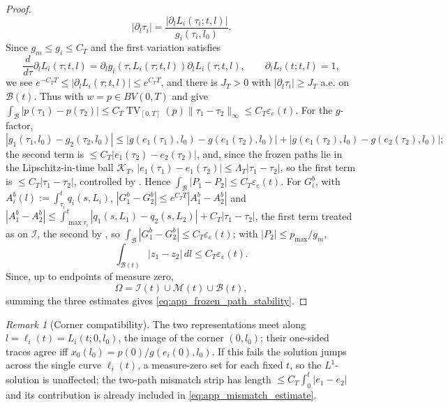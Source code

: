 \documentclass[a4paper,fleqn,longmktitle]{cas-sc}
\theoremstyle{plain}
\theoremstyle{definition}
\theoremstyle{remark}
\newtheorem{remark}[theorem]{Remark}
\numberwithin{equation}{section}
\begin{document}
\begin{proof}
\[
    |\partial_l\tau_i|
    =
    \frac{|\partial_lL_i(\tau_i;t,l)|}{g_i(\tau_i,l_0)}.
\]
Since \(g_m\le g_i\le C_T\) and the first variation satisfies
\[
    \frac{d}{d\tau}\partial_lL_i(\tau;t,l)
    =
    \partial_lg_i(\tau,L_i(\tau;t,l))\partial_lL_i(\tau;t,l),
    \qquad
    \partial_lL_i(t;t,l)=1,
\]
we see $e^{-C_TT}
    \le
    |\partial_lL_i(\tau;t,l)|
    \le
    e^{C_TT}$, and there is \(J_T>0\) with \(|\partial_l\tau_i|\ge J_T\) a.e. on \(\mathcal B(t)\).
Thus  with \(w=p\in BV(0,T)\) and
 give
\(\int_{\mathcal B}|p(\tau_1)-p(\tau_2)|\le C_T\operatorname{TV}_{[0,T]}(p)
\|\tau_1-\tau_2\|_\infty\le C_T\varepsilon_e(t)\). For the \(g\)-factor,
\[
    |g_1(\tau_1,l_0)-g_2(\tau_2,l_0)|
    \le
    |g(e_1(\tau_1),l_0)-g(e_1(\tau_2),l_0)|
    +
    |g(e_1(\tau_2),l_0)-g(e_2(\tau_2),l_0)|;
\]
the second term is \(\le C_T|e_1(\tau_2)-e_2(\tau_2)|\), and, since the frozen
paths lie in the Lipschitz-in-time ball \(\mathcal K_T\),
\(|e_1(\tau_1)-e_1(\tau_2)|\le\Lambda_T|\tau_1-\tau_2|\), so the first term is
\(\le C_T|\tau_1-\tau_2|\), controlled by .
Hence \(\int_{\mathcal B}|P_1-P_2|\le C_T\varepsilon_e(t)\). For \(G_i^b\), with
\(A_i^b(l):=\int_{\tau_i}^t q_i(s,L_i)\), \(|G_1^b-G_2^b|\le e^{C_TT}|A_1^b-A_2^b|\)
and
\(|A_1^b-A_2^b|\le\int_{\max\tau_i}^t|q_1(s,L_1)-q_2(s,L_2)|+C_T|\tau_1-\tau_2|\),
the first term treated as on \(\mathcal I\), the second by
, so
\(\int_{\mathcal B}|G_1^b-G_2^b|\le C_T\varepsilon_e(t)\); with
\(|P_2|\le p_{\max}/g_m\),
\begin{equation}
    \label{eq:app_boundary_region_estimate}
    \int_{\mathcal B(t)}|z_1-z_2|\,dl\le C_T\varepsilon_e(t).
\end{equation}
Since, up to endpoints of measure zero,
\[
    \Omega=\mathcal I(t)\cup\mathcal M(t)\cup\mathcal B(t),
\]
summing the three estimates gives \eqref{eq:app_frozen_path_stability}.
\end{proof}
\begin{remark}[Corner compatibility]
\label{rem:app_corner_compatibility}
The two representations meet along \(l=\ell_i(t)=L_i(t;0,l_0)\), the image of
the corner \((0,l_0)\); their one-sided traces agree iff
\(x_0(l_0)=p(0)/g(e_i(0),l_0)\). If this fails the solution jumps across the
single curve \(\ell_i(t)\), a measure-zero set for each fixed \(t\), so the
\(L^1\)-solution is unaffected; the two-path mismatch strip has length
\(\le C_T\int_0^t|e_1-e_2|\) and its contribution is already included in
\eqref{eq:app_mismatch_estimate}.
\end{remark}
\end{document}
